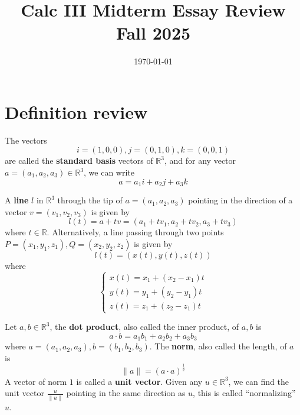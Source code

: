 \documentclass[openany]{book}
\title{Calc III Midterm Essay Review
\\ 
\vspace{0.4cm}
\large Fall 2025}
\date{\today}
\newcommand{\R}{\mathbb{R}}
\begin{document}
\maketitle

\tableofcontents
\newpage

\chapter{Definition review}


\begin{defn}[standard basis in $\R^3$]
    The vectors 
    \begin{equation*}
        i=(1,0,0), j=(0,1,0), k=(0,0,1)
    \end{equation*}
    are called the \textbf{standard basis} vectors of $\R^3$, and for any vector $a=(a_1,a_2,a_3)\in\R^3$, we can write 
    \begin{equation*}
        a=a_1i+a_2j+a_3k
    \end{equation*}
\end{defn}



\begin{defn}\label{line}
    A \textbf{line} $l$ in $\R^3$ through the tip of $a=(a_1,a_2,a_3)$ pointing in the direction of a vector $v=(v_1,v_2,v_3)$ is given by 
    \begin{equation*}
        l(t)=a+tv=(a_1+tv_1, a_2+tv_2, a_3+tv_3)
    \end{equation*}
    where $t\in\R$. Alternatively, a line passing through two points $P=(x_1,y_1,z_1), Q=(x_2,y_2,z_2)$ is given by 
    \begin{equation*}
        l(t)=(x(t), y(t), z(t))
    \end{equation*}
    where 
    \begin{equation*}
        \begin{cases}
            x(t)=x_1+(x_2-x_1)t\\
            y(t)=y_1+(y_2-y_1)t\\
            z(t)=z_1+(z_2-z_1)t
        \end{cases}
    \end{equation*}
\end{defn}



\begin{defn}
    Let $a,b\in\R^3$, the \textbf{dot product}, also called the inner product, of $a,b$ is 
    \begin{equation*}
        a\cdot b=a_1b_1+a_2b_2+a_3b_3
    \end{equation*}
    where $a=(a_1,a_2,a_3), b=(b_1,b_2,b_3)$. The \textbf{norm}, also called the length, of $a$ is 
    \begin{equation*}
        \|a\|=(a\cdot a)^\frac{1}{2}
    \end{equation*}
    A vector of norm $1$ is called a \textbf{unit vector}. Given any $u\in\R^3$, we can find the unit vector $\frac{u}{\|u\|}$ pointing in the same direction as $u$, this is called ``normalizing'' $u$.
\end{defn}
\end{document}
